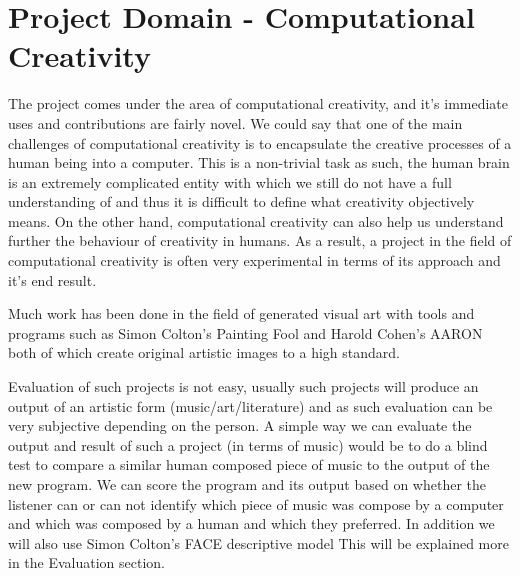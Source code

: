 \documentclass[pdftex,12pt,a4paper]{report}
\begin{document}
\section{Project Domain - Computational Creativity}
The project comes under the area of computational creativity, and it's immediate uses and contributions are fairly novel. We could say that one of the main challenges of computational creativity is to encapsulate the creative processes of a human being into a computer. This is a non-trivial task as such, the human brain is an extremely complicated entity with which we still do not have a full understanding of and thus it is difficult to define what creativity objectively means. On the other hand, computational creativity can also help us understand further the behaviour of creativity in humans. As a result, a project in the field of computational creativity is often very experimental in terms of its approach and it's end result. 

Much work has been done in the field of generated visual art with tools and programs such as Simon Colton's Painting Fool \cite{website:paintingfool} and Harold Cohen's AARON \cite{website:aaron} both of which create original artistic images to a high standard.

Evaluation of such projects is not easy, usually such projects will produce an output of an artistic form (music/art/literature) and as such evaluation can be very subjective depending on the person. A simple way we can evaluate the output and result of such a project (in terms of music) would be to do a blind test to compare a similar human composed piece of music to the output of the new program. We can score the program and its output based on whether the listener can or can not identify which piece of music was compose by a computer and which was composed by a human and which they preferred. In addition we will also use Simon Colton's FACE descriptive model \cite{coltonface2011} This will be explained more in the Evaluation section.
\end{document}
